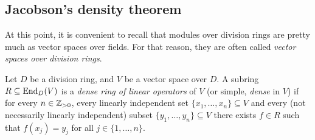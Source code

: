 %
%


\subsection{Jacobson's density theorem}

At this point, it is convenient to recall that
modules over division rings are pretty much as vector spaces over fields. For that reason, 
they are often called \emph{vector spaces over division rings}. 

\begin{definition}
	Let $D$ be a division ring, and $V$ be a vector space over $D$. A subring 
	$R\subseteq\operatorname{End}_D(V)$ is a \emph{dense ring of linear operators} 
	of $V$ (or simple, \emph{dense} in $V$) if for every  
	$n\in\mathbb{Z}_{>0}$, every linearly independent set $\{x_1,\dots,x_n\}\subseteq V$ 
	and every (not necessarily linearly independent) subset $\{y_1,\dots,y_n\}\subseteq V$ 
	there exists $f\in R$ such that $f(x_j)=y_j$ for all 
	$j\in\{1,\dots,n\}$.
\end{definition}

